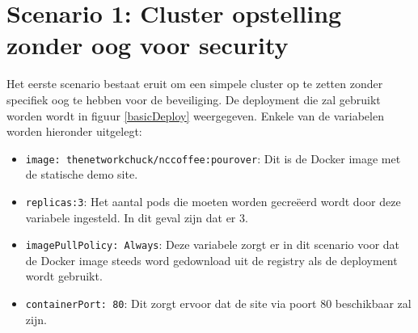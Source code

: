 \clearpage
\section{Scenario 1: Cluster opstelling zonder oog voor security}

Het eerste scenario bestaat eruit om een simpele cluster op te zetten zonder specifiek oog te hebben voor de beveiliging. De deployment die zal gebruikt worden wordt in figuur \ref{basicDeploy} weergegeven. Enkele van de variabelen worden hieronder uitgelegt: 
\begin{itemize}
	\item \verb|image: thenetworkchuck/nccoffee:pourover|: Dit is de Docker image met de statische demo site.
	\item \verb|replicas:3|: Het aantal pods die moeten worden gecreëerd wordt door deze variabele ingesteld. In dit geval zijn dat er 3.
	\item \verb|imagePullPolicy: Always|: Deze variabele zorgt er in dit scenario voor dat de Docker image steeds word gedownload uit de registry als de deployment wordt gebruikt.
	\item \verb|containerPort: 80|: Dit zorgt ervoor dat de site via poort 80 beschikbaar zal zijn.
\end{itemize}

